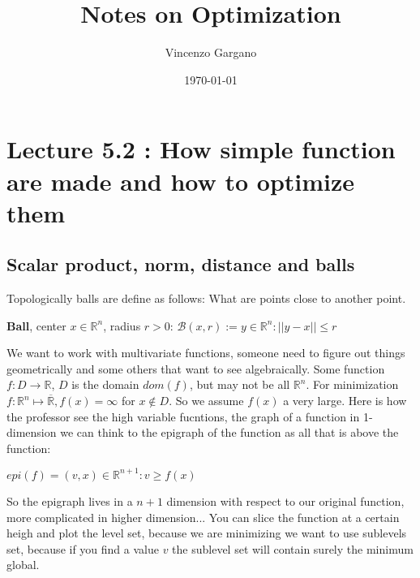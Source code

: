 \documentclass[12pt]{book}
\title{Notes on Optimization}
\author{Vincenzo Gargano}
\begin{document}

\date{\today}

\maketitle

\tableofcontents
\clearpage

\chapter{Lecture 5.2 : How simple function are made and how to optimize them} %


\section{Scalar product, norm, distance and balls}
Topologically balls are define as follows: What are points close to another point.\newline\newline
\begin{define}
	\textbf{Ball}, center $x \in \mathbb{R}^n$, radius $r > 0$: $\mathcal{B}(x, r) := {y \in \mathbb{R}^n : ||y - x|| \leq r}$
\end{define}
We want to work with multivariate functions, someone need to figure out things geometrically and some others that want to see algebraically.\newline
Some function $f: D \to \mathbb{R}$, $D$ is the domain $dom(f)$, but may not be all $\mathbb{R}^n$. For minimization $f: \mathbb{R}^n \mapsto \mathbb{\overline{R}}, f(x) = \infty$ for $x \notin D$. So we assume $f(x)$ a very large.
\newline\newline
Here is how the professor see the high variable fucntions, the graph of a function in 1-dimension we can think to the epigraph of the function as all that is above the function: 
\newline\newline
\begin{definition}[Epigraph]
		$epi(f) = {(v, x) \in \mathbb{R}^{n+1} : v \ge f(x)}$
\end{definition}
\newline\newline
So the epigraph lives in a $n+1$ dimension with respect to our original function, more complicated in higher dimension...\newline
You can slice the function at a certain heigh and plot the level set, because we are minimizing we want to use sublevels set, because if you find a value $v$ the sublevel set will contain surely the minimum global.\newline
\end{document}
